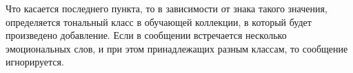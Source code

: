     Что касается последнего пункта, то в зависимости от знака такого значения,
    определяется тональный класс в обучающей коллекции, в который будет
    произведено добавление. Если в сообщении встречается несколько эмоциональных
    слов, и при этом принадлежащих разным классам, то сообщение игнорируется.

